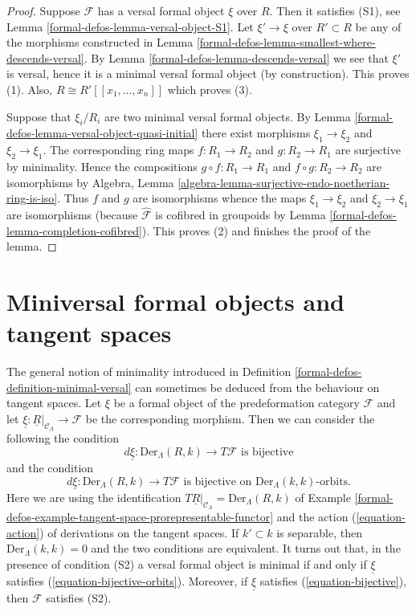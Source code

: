 \begin{proof}
Suppose $\mathcal{F}$ has a versal formal object $\xi$ over $R$.
Then it satisfies (S1), see
Lemma \ref{formal-defos-lemma-versal-object-S1}.
Let $\xi' \to \xi$ over $R' \subset R$ be any of the morphisms constructed in
Lemma \ref{formal-defos-lemma-smallest-where-descends-versal}.
By
Lemma \ref{formal-defos-lemma-descends-versal}
we see that $\xi'$ is versal, hence it is a minimal versal formal
object (by construction). This proves (1).
Also, $R \cong R'[[x_1, \ldots, x_n]]$ which proves (3).

\medskip\noindent
Suppose that $\xi_i/R_i$ are two minimal versal formal objects. By
Lemma \ref{formal-defos-lemma-versal-object-quasi-initial}
there exist morphisms $\xi_1 \to \xi_2$ and $\xi_2 \to \xi_1$.
The corresponding ring maps $f : R_1 \to R_2$ and $g : R_2 \to R_1$
are surjective by minimality. Hence the compositions
$g \circ f : R_1 \to R_1$ and $f \circ g : R_2 \to R_2$ are
isomorphisms by
Algebra, Lemma \ref{algebra-lemma-surjective-endo-noetherian-ring-is-iso}.
Thus $f$ and $g$ are isomorphisms whence the maps
$\xi_1 \to \xi_2$ and $\xi_2 \to \xi_1$ are isomorphisms
(because $\widehat{\mathcal{F}}$ is cofibred in groupoids by
Lemma \ref{formal-defos-lemma-completion-cofibred}). This proves (2) and
finishes the proof of the lemma.
\end{proof}

\section{Miniversal formal objects and tangent spaces}
\label{formal-defos-section-miniversal-objects-existence}
The general notion of minimality introduced in
Definition \ref{formal-defos-definition-minimal-versal}
can sometimes be deduced from the behaviour on tangent spaces.
Let $\xi$ be a formal object of the predeformation category
$\mathcal{F}$ and let
$\underline{\xi} : \underline{R}|_{\mathcal{C}_\Lambda} \to \mathcal{F}$
be the corresponding morphism. Then we can consider the following
the condition
\begin{equation}
\label{equation-bijective}
d\underline{\xi} : \text{Der}_\Lambda(R, k) \to T\mathcal{F}
\text{ is bijective}
\end{equation}
and the condition
\begin{equation}
\label{equation-bijective-orbits}
d\underline{\xi} : \text{Der}_\Lambda(R, k) \to T\mathcal{F}
\text{ is bijective on }\text{Der}_\Lambda(k, k)\text{-orbits.}
\end{equation}
Here we are using the identification
$T\underline{R}|_{\mathcal{C}_\Lambda} = \text{Der}_\Lambda(R, k)$ of
Example \ref{formal-defos-example-tangent-space-prorepresentable-functor}
and the action (\ref{equation-action}) of derivations
on the tangent spaces. If $k' \subset k$ is separable, then
$\text{Der}_\Lambda(k, k) = 0$ and the two conditions are equivalent.
It turns out that, in the presence of condition (S2) a versal formal
object is minimal if and only if $\underline{\xi}$ satisfies
(\ref{equation-bijective-orbits}).
Moreover, if $\underline{\xi}$ satisfies (\ref{equation-bijective}), then
$\mathcal{F}$ satisfies (S2).

